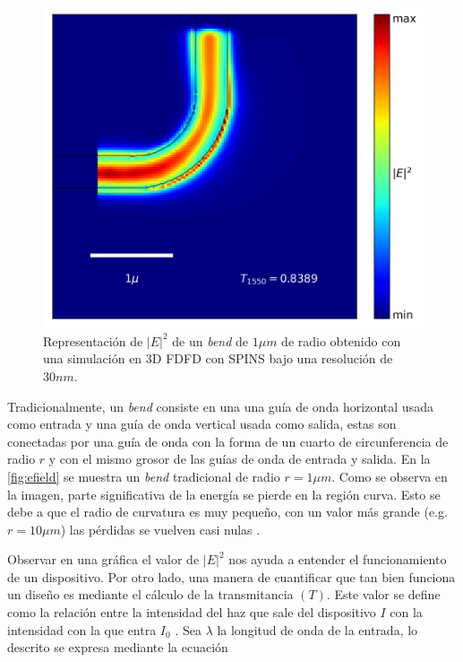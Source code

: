 \begin{figure}[ht]
  \centering
  \includegraphics[scale=0.7]{image/theory/bend_field_dx30_px16_rint1000.png}
  \caption{Representación de $|E|^2$ de un \emph{bend} de $1 \mu m$ de radio obtenido con una simulación en 3D FDFD con SPINS
  bajo una resolución de $30 nm$.}
  \label{fig:efield}
\end{figure}


Tradicionalmente, un \emph{bend} consiste en una una guía de onda horizontal usada como entrada y
una guía de onda vertical usada como salida, estas son conectadas por una guía de onda con la forma de un
cuarto de circunferencia de radio $r$ y con el mismo grosor de las guías de onda de entrada y salida.
En la \autoref{fig:efield} se muestra un \emph{bend} tradicional de radio $r = 1 \mu m$.
Como se observa en la imagen, parte significativa de la energía se pierde en la región curva.
Esto se debe a que el radio de curvatura es muy pequeño, con un valor más grande (e.g. $r = 10 \mu m$) 
las pérdidas se vuelven casi nulas \citep{LukasChrostowski2010}.


Observar en una gráfica el valor de $|E|^2$ nos ayuda a entender el funcionamiento de un dispositivo.
Por otro lado, una manera de cuantificar que tan bien funciona un diseño es mediante el cálculo de la
transmitancia $(T)$.
Este valor se define como la relación entre la intensidad del haz que sale del dispositivo $I$ con la
intensidad con la que entra $I_0$ \citep{Su2020}.
Sea $\lambda$ la longitud de onda de la entrada, lo descrito se expresa mediante la ecuación

